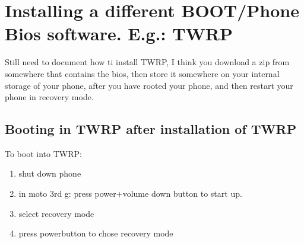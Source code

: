 \section{Installing a different BOOT/Phone Bios software. E.g.: TWRP}\label{sec:ch3}
Still need to document how ti install TWRP, I think you download a zip from somewhere that contains the bios, then store it somewhere on your internal storage of your phone, after you have rooted your phone, and then restart your phone in recovery mode.
\subsection{Booting in TWRP after installation of TWRP}\label{sec:t2_back}
To boot into TWRP:
\begin{enumerate}
    \item shut down phone
    \item in moto 3rd g: press power+volume down button to start up.
    \item select recovery mode
    \item press powerbutton to chose recovery mode
\end{enumerate}
